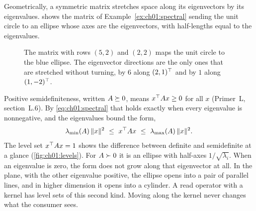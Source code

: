 Geometrically, a symmetric matrix stretches space along its eigenvectors by
its eigenvalues.  shows the matrix of
Example~\ref{ex:ch01:spectral} sending the unit circle to an ellipse whose axes are
the eigenvectors, with half-lengths equal to the eigenvalues.

\begin{figure}[tbp]
\centering
{}
\caption{The matrix with rows $(5,2)$ and $(2,2)$ maps the unit circle to the
blue ellipse. The eigenvector directions are the only ones that are stretched
without turning, by $6$ along $(2,1)^{\top}$ and by $1$ along $(1,-2)^{\top}$.}
\label{fig:ch01:circle}
\end{figure}

Positive semidefiniteness, written $A\succeq 0$, means $x^{\top} Ax\ge 0$ for all $x$
(Primer~L, section~L.6). By \cref{eq:ch01:spectral} that holds exactly when
every eigenvalue is nonnegative, and the eigenvalues bound the form,
\begin{equation}\label{eq:ch01:rayleighbounds}
\lambda_{\min}(A)\,\norm{x}^2\ \le\ x\T Ax\ \le\ \lambda_{\max}(A)\,\norm{x}^2 .
\end{equation}
The level set $x^{\top} Ax=1$ shows the difference between definite and
semidefinite at a glance (\cref{fig:ch01:levels}). For $A\succ0$ it is an ellipse
with half-axes $1/\sqrt{\lambda_i}$. When an eigenvalue is zero, the form does
not grow along that eigenvector at all. In the plane, with the other eigenvalue
positive, the ellipse opens into a pair of parallel lines, and in higher
dimension it opens into a cylinder. A read operator with a kernel has level sets of this second
kind. Moving along the kernel never changes what the consumer sees.

